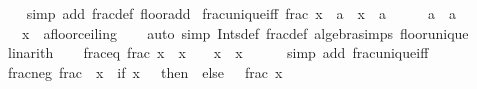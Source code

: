 \begin{isabellebody}
%
\isadelimproof
\ \ %
\endisadelimproof
%
\isatagproof
{}\isamarkupfalse%
\ {\isacharparenleft}{\kern0pt}simp\ add{\isacharcolon}{\kern0pt}\ frac{\isacharunderscore}{\kern0pt}def\ floor{\isacharunderscore}{\kern0pt}add{\isacharparenright}{\kern0pt}%
\endisatagproof
{\isafoldproof}%
%
\isadelimproof
\isanewline
%
\endisadelimproof
\isanewline
{}\isamarkupfalse%
\ frac{\isacharunderscore}{\kern0pt}unique{\isacharunderscore}{\kern0pt}iff{\isacharcolon}{\kern0pt}\ {\isachardoublequoteopen}frac\ x\ {\isacharequal}{\kern0pt}\ a\ {\isasymlongleftrightarrow}\ x\ {\isacharminus}{\kern0pt}\ a\ {\isasymin}\ {\isasymint}\ {\isasymand}\ {}\ {\isasymle}\ a\ {\isasymand}\ a\ {\isacharless}{\kern0pt}\ {}{\isachardoublequoteclose}\isanewline
\ \ \ x\ {\isacharcolon}{\kern0pt}{\isacharcolon}{\kern0pt}\ {\isachardoublequoteopen}{\isacharprime}{\kern0pt}a{\isacharcolon}{\kern0pt}{\isacharcolon}{\kern0pt}floor{\isacharunderscore}{\kern0pt}ceiling{\isachardoublequoteclose}\isanewline
%
\isadelimproof
\ \ %
\endisadelimproof
%
\isatagproof
{}\isamarkupfalse%
\ {\isacharparenleft}{\kern0pt}auto\ simp{\isacharcolon}{\kern0pt}\ Ints{\isacharunderscore}{\kern0pt}def\ frac{\isacharunderscore}{\kern0pt}def\ algebra{\isacharunderscore}{\kern0pt}simps\ floor{\isacharunderscore}{\kern0pt}unique{\isacharparenright}{\kern0pt}\isanewline
\ \ \ \isamarkupfalse%
\ linarith{\isacharplus}{\kern0pt}\isanewline
\ \ \isamarkupfalse%
%
\endisatagproof
{\isafoldproof}%
%
\isadelimproof
\isanewline
%
\endisadelimproof
\isanewline
{}\isamarkupfalse%
\ frac{\isacharunderscore}{\kern0pt}eq{\isacharcolon}{\kern0pt}\ {\isachardoublequoteopen}frac\ x\ {\isacharequal}{\kern0pt}\ x\ {\isasymlongleftrightarrow}\ {}\ {\isasymle}\ x\ {\isasymand}\ x\ {\isacharless}{\kern0pt}\ {}{\isachardoublequoteclose}\isanewline
%
\isadelimproof
\ \ %
\endisadelimproof
%
\isatagproof
{}\isamarkupfalse%
\ {\isacharparenleft}{\kern0pt}simp\ add{\isacharcolon}{\kern0pt}\ frac{\isacharunderscore}{\kern0pt}unique{\isacharunderscore}{\kern0pt}iff{\isacharparenright}{\kern0pt}%
\endisatagproof
{\isafoldproof}%
%
\isadelimproof
\isanewline
%
\endisadelimproof
\isanewline
{}\isamarkupfalse%
\ frac{\isacharunderscore}{\kern0pt}neg{\isacharcolon}{\kern0pt}\ {\isachardoublequoteopen}frac\ {\isacharparenleft}{\kern0pt}{\isacharminus}{\kern0pt}\ x{\isacharparenright}{\kern0pt}\ {\isacharequal}{\kern0pt}\ {\isacharparenleft}{\kern0pt}if\ x\ {\isasymin}\ {\isasymint}\ then\ {}\ else\ {}\ {\isacharminus}{\kern0pt}\ frac\ x{\isacharparenright}{\kern0pt}{\isachardoublequoteclose}\isanewline

\end{isabellebody}
